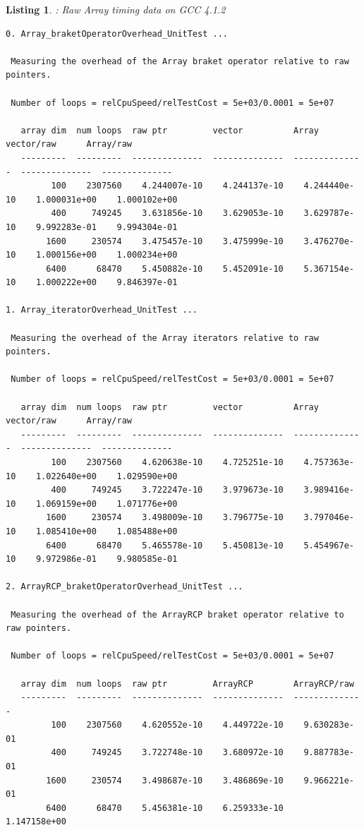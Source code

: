 \documentclass[pdf,ps2pdf,11pt]{SANDreport}
\newtheorem{listing}{Listing}
\begin{document}
\begin{listing}: Raw Array timing data on GCC 4.1.2  \\
\label{listing:Array-GCC-Timings}
{\scriptsize\begin{verbatim}
0. Array_braketOperatorOverhead_UnitTest ... 
 
 Measuring the overhead of the Array braket operator relative to raw pointers.
 
 Number of loops = relCpuSpeed/relTestCost = 5e+03/0.0001 = 5e+07
 
   array dim  num loops  raw ptr         vector          Array           vector/raw      Array/raw     
   ---------  ---------  --------------  --------------  --------------  --------------  --------------
         100    2307560    4.244007e-10    4.244137e-10    4.244440e-10    1.000031e+00    1.000102e+00
         400     749245    3.631856e-10    3.629053e-10    3.629787e-10    9.992283e-01    9.994304e-01
        1600     230574    3.475457e-10    3.475999e-10    3.476270e-10    1.000156e+00    1.000234e+00
        6400      68470    5.450882e-10    5.452091e-10    5.367154e-10    1.000222e+00    9.846397e-01

1. Array_iteratorOverhead_UnitTest ... 
 
 Measuring the overhead of the Array iterators relative to raw pointers.
 
 Number of loops = relCpuSpeed/relTestCost = 5e+03/0.0001 = 5e+07
 
   array dim  num loops  raw ptr         vector          Array           vector/raw      Array/raw     
   ---------  ---------  --------------  --------------  --------------  --------------  --------------
         100    2307560    4.620638e-10    4.725251e-10    4.757363e-10    1.022640e+00    1.029590e+00
         400     749245    3.722247e-10    3.979673e-10    3.989416e-10    1.069159e+00    1.071776e+00
        1600     230574    3.498009e-10    3.796775e-10    3.797046e-10    1.085410e+00    1.085488e+00
        6400      68470    5.465578e-10    5.450813e-10    5.454967e-10    9.972986e-01    9.980585e-01

2. ArrayRCP_braketOperatorOverhead_UnitTest ... 
 
 Measuring the overhead of the ArrayRCP braket operator relative to raw pointers.
 
 Number of loops = relCpuSpeed/relTestCost = 5e+03/0.0001 = 5e+07
 
   array dim  num loops  raw ptr         ArrayRCP        ArrayRCP/raw  
   ---------  ---------  --------------  --------------  --------------
         100    2307560    4.620552e-10    4.449722e-10    9.630283e-01
         400     749245    3.722748e-10    3.680972e-10    9.887783e-01
        1600     230574    3.498687e-10    3.486869e-10    9.966221e-01
        6400      68470    5.456381e-10    6.259333e-10    1.147158e+00


\end{verbatim}}
\end{listing}
\end{document}
